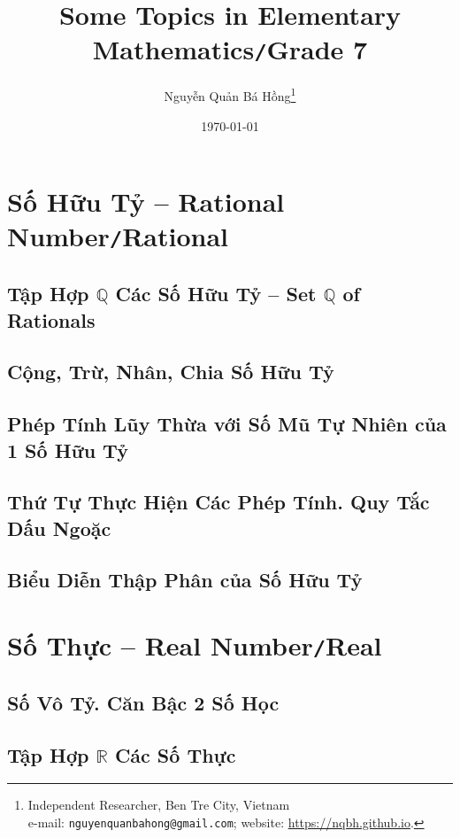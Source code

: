 \documentclass[oneside]{book}
\title{Some Topics in Elementary Mathematics\texttt{/}Grade 7}
\author{Nguyễn Quản Bá Hồng\footnote{Independent Researcher, Ben Tre City, Vietnam\\e-mail: \texttt{nguyenquanbahong@gmail.com}; website: \url{https://nqbh.github.io}.}}
\date{\today}
\numberwithin{equation}{section}
\begin{document}
\maketitle
\setcounter{secnumdepth}{4}
\setcounter{tocdepth}{3}
\tableofcontents
\newpage


\chapter{Số Hữu Tỷ -- Rational Number\texttt{/}Rational}

\section{Tập Hợp $\mathbb{Q}$ Các Số Hữu Tỷ -- Set $\mathbb{Q}$ of Rationals}

\section{Cộng, Trừ, Nhân, Chia Số Hữu Tỷ}

\section{Phép Tính Lũy Thừa với Số Mũ Tự Nhiên của 1 Số Hữu Tỷ}

\section{Thứ Tự Thực Hiện Các Phép Tính. Quy Tắc Dấu Ngoặc}

\section{Biểu Diễn Thập Phân của Số Hữu Tỷ}


\chapter{Số Thực -- Real Number\texttt{/}Real}

\section{Số Vô Tỷ. Căn Bậc 2 Số Học}

\section{Tập Hợp $\mathbb{R}$ Các Số Thực}
\end{document}
